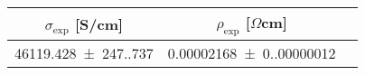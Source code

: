 \begin{tabular}{ccc}
\toprule
$\sigma_{\exp}$ [S/cm] & $\rho_{\exp}$ [$\Omega$cm] \\
\midrule
\num{46119.428(247.737)} & \num{0.00002168(0.00000012)} \\
\bottomrule
\end{tabular}
